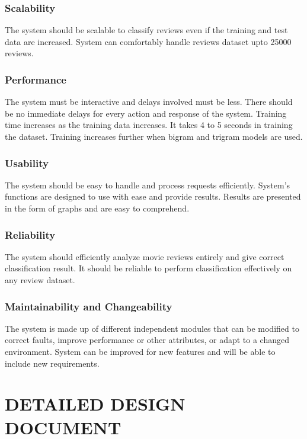 \documentclass[oneside,a4paper,12pt]{pictreport}
\begin{document}
\subsection{Scalability}
The system should be scalable to classify reviews even if the training and test data are increased. System can comfortably handle 
reviews dataset upto 25000 reviews.

\subsection{Performance}
The system must be interactive and delays involved must be less. There should be no immediate delays for every action and response of the system. Training time increases as the training data increases. It takes 4 to 5 seconds in training the dataset. Training increases further when bigram and trigram models are used.


\subsection{Usability}
The system should be easy to handle and process requests efficiently. System's functions are designed to use with ease and provide results. Results are presented in the form of graphs and are easy to comprehend.

\subsection{Reliability}
The system should efficiently analyze movie reviews entirely and give correct classification result. It should be reliable to perform 
classification effectively on any review dataset.
\subsection{Maintainability and Changeability}
The system is made up of different independent modules that can be modified to correct faults, improve performance or other attributes, or adapt to a changed environment. System can be improved for new features and will be able to include new requirements.

\chapter{DETAILED DESIGN DOCUMENT}
\end{document}

